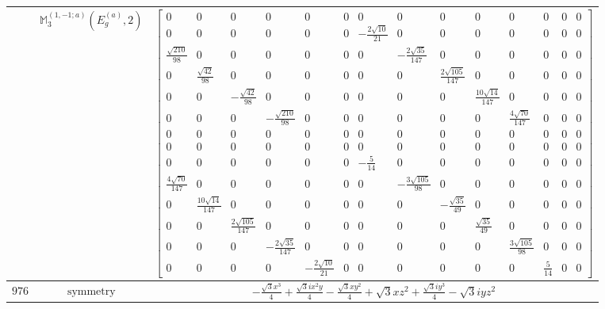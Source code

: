\documentclass[fleqn,8pt,landscape]{jsarticle}
\begin{document}
\begin{longtable}{ccc}
$  $ & $ \mathbb{M}_{3}^{(1,-1;a)}(E_{g}^{(a)},2) $ & $ \begin{bmatrix} 0 & 0 & 0 & 0 & 0 & 0 & 0 & 0 & 0 & 0 & 0 & 0 & 0 & 0 \\ 0 & 0 & 0 & 0 & 0 & 0 & - \frac{2 \sqrt{10}}{21} & 0 & 0 & 0 & 0 & 0 & 0 & 0 \\ \frac{\sqrt{210}}{98} & 0 & 0 & 0 & 0 & 0 & 0 & - \frac{2 \sqrt{35}}{147} & 0 & 0 & 0 & 0 & 0 & 0 \\ 0 & \frac{\sqrt{42}}{98} & 0 & 0 & 0 & 0 & 0 & 0 & \frac{2 \sqrt{105}}{147} & 0 & 0 & 0 & 0 & 0 \\ 0 & 0 & - \frac{\sqrt{42}}{98} & 0 & 0 & 0 & 0 & 0 & 0 & \frac{10 \sqrt{14}}{147} & 0 & 0 & 0 & 0 \\ 0 & 0 & 0 & - \frac{\sqrt{210}}{98} & 0 & 0 & 0 & 0 & 0 & 0 & \frac{4 \sqrt{70}}{147} & 0 & 0 & 0 \\ 0 & 0 & 0 & 0 & 0 & 0 & 0 & 0 & 0 & 0 & 0 & 0 & 0 & 0 \\ 0 & 0 & 0 & 0 & 0 & 0 & 0 & 0 & 0 & 0 & 0 & 0 & 0 & 0 \\ 0 & 0 & 0 & 0 & 0 & 0 & - \frac{5}{14} & 0 & 0 & 0 & 0 & 0 & 0 & 0 \\ \frac{4 \sqrt{70}}{147} & 0 & 0 & 0 & 0 & 0 & 0 & - \frac{3 \sqrt{105}}{98} & 0 & 0 & 0 & 0 & 0 & 0 \\ 0 & \frac{10 \sqrt{14}}{147} & 0 & 0 & 0 & 0 & 0 & 0 & - \frac{\sqrt{35}}{49} & 0 & 0 & 0 & 0 & 0 \\ 0 & 0 & \frac{2 \sqrt{105}}{147} & 0 & 0 & 0 & 0 & 0 & 0 & \frac{\sqrt{35}}{49} & 0 & 0 & 0 & 0 \\ 0 & 0 & 0 & - \frac{2 \sqrt{35}}{147} & 0 & 0 & 0 & 0 & 0 & 0 & \frac{3 \sqrt{105}}{98} & 0 & 0 & 0 \\ 0 & 0 & 0 & 0 & - \frac{2 \sqrt{10}}{21} & 0 & 0 & 0 & 0 & 0 & 0 & \frac{5}{14} & 0 & 0 \end{bmatrix} $ \\ \hline
$ 976 $ & $ \text{symmetry} $ & $ - \frac{\sqrt{3} x^{3}}{4} + \frac{\sqrt{3} i x^{2} y}{4} - \frac{\sqrt{3} x y^{2}}{4} + \sqrt{3} x z^{2} + \frac{\sqrt{3} i y^{3}}{4} - \sqrt{3} i y z^{2} $ \\

\end{longtable}
\end{document}
